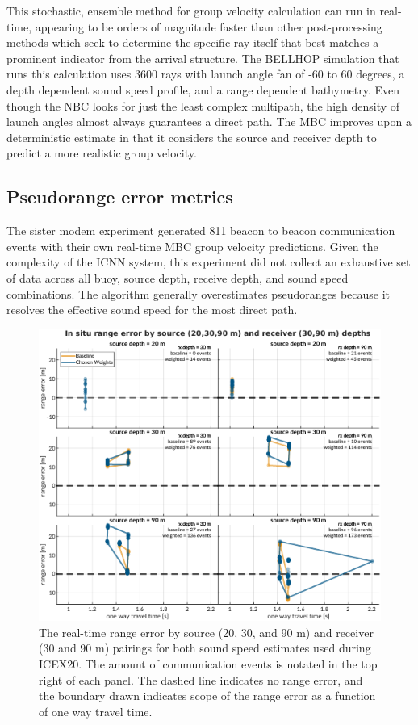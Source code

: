 This stochastic, ensemble method for group velocity calculation can run in real-time, appearing to be orders of magnitude faster than other post-processing methods which seek to determine the specific ray itself that best matches a prominent indicator from the arrival structure.
The BELLHOP simulation that runs this calculation uses 3600 rays with launch angle fan of -60 to 60 degrees, a depth dependent sound speed profile, and a range dependent bathymetry. 
Even though the NBC looks for just the least complex multipath, the high density of launch angles almost always guarantees a direct path.
The MBC improves upon a deterministic estimate in that it considers the source and receiver depth to predict a more realistic group velocity.

\subsection{Pseudorange error metrics}

The sister modem experiment generated 811 beacon to beacon communication events with their own real-time MBC group velocity predictions.
Given the complexity of the ICNN system, this experiment did not collect an exhaustive set of data across all buoy, source depth, receive depth, and sound speed combinations.
 The algorithm generally overestimates pseudoranges because it resolves the effective sound speed for the most direct path.

\begin{figure}[h!]
  \centering
  \includegraphics[width=\reprintcolumnwidth]{figs/range-error-insitu.pdf}
  \caption{The real-time range error by source (20, 30, and 90 m) and receiver (30 and 90 m) pairings for both sound speed estimates used during ICEX20. The amount of communication events is notated in the top right of each panel. The dashed line indicates no range error, and the boundary drawn indicates scope of the range error as a function of one way travel time.}
  \label{fig:range-error-insitu}
\end{figure}

